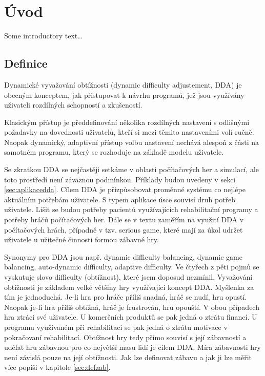 \chapter{Úvod}
Some introductory text\dots

\section{Definice}

Dynamické vyvažování obtížnosti (dynamic difficulty adjustement, DDA) je obecným konceptem, jak přistupovat k návrhu programů, jež jsou využívány uživateli rozdílných schopností a zkušeností. 

Klasickým přístup je předdefinování několika rozdílných nastavení s odlišnými požadavky na dovednosti uživatelů, kteří si mezi těmito nastaveními volí ručně. Naopak dynamický, adaptivní přístup volbu nastavení nechává alespoň z části na samotném programu, který se rozhoduje na základě modelu uživatele.

Se zkratkou DDA se nejčastěji setkáme v oblasti počítačových her a simulací, ale toto prostředí není závaznou podmínkou. Příklady budou uvedeny v sekci \ref{sec:aplikacedda}. Cílem DDA je přizpůsobovat proměnné systému co nejlépe aktuálním potřebám uživatele.  S typem aplikace úsce souvisí druh potřeb uživatele. Lišit se budou potřeby pacientů využívajících rehabilitační programy a potřeby hráčů počítačových her. Dále se v textu zaměřím na využití DDA v počítačových hrách, případně v tzv. serious game, které mají za úkol udržet uživatele u užitečné činnosti formou zábavné hry.

Synonymy pro DDA jsou např. dynamic difficulty balancing, dynamic game balancing, auto-dynamic difficulty, adaptive difficulty. Ve čtyřech z pěti pojmů se vyskutuje slovo difficulty (obtížnost), které jsem doposud nezmínil. Vyvažování obtížnosti je základem velké většiny hry využívající koncept DDA. Myšlenka za tím je jednoduchá. Je-li hra pro hráče příliš snadná, hráč se nudí, hru opustí. Naopak je-li hra příliš obtížná, hráč je frustrován, hru opouští. V obou případech hra ztrácí své uživatele. U komerčních produktů se pak jedná o ztrátu financí. U programu využívaném při rehabilitaci se pak jedná o ztrátu motivace v pokračovaní rehabilitací. Obtížnost hry tedy přímo souvisí s její zábavností a udělat hru zábavnou pro co největší masu lidí je cílem DDA. Míra zábavnosti hry není závislá pouze na její obtížnosti. Jak lze definovat zábavu a jak ji lze měřit více popíši v kapitole \ref{sec:defzab}. 

